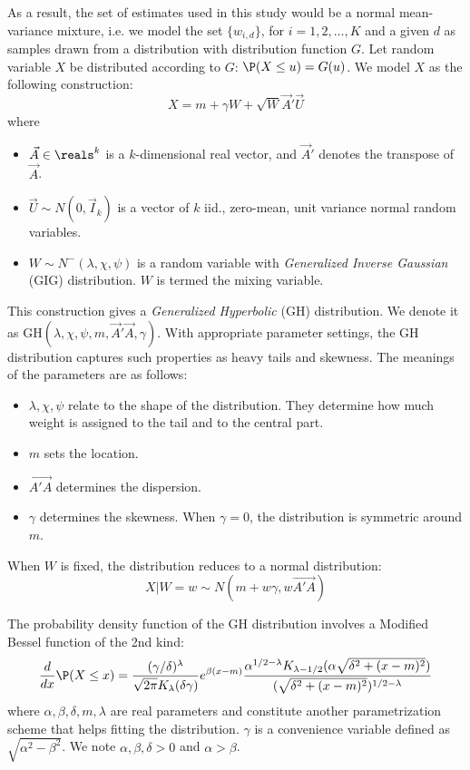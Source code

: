 \documentclass[a4paper,11pt,pdftex,twoside,titlepage]{article}
\begin{document}
As a result, the set of estimates used in this study would be a
normal mean-variance mixture, i.e. we model the set
$\{w_{i,d}\}$, for $i=1,2,\dots, K$ and a given $d$ as samples drawn from
a distribution with distribution function $G$. Let random variable $X$
be distributed according to $G$: $\P(X \leq u) = G(u)$. We model $X$
as the following construction:
\begin{equation}
  \label{eq:rghh6}
  X = m + \gamma W + \sqrt{W} \vec A' \vec U  
\end{equation}
where
\begin{itemize}
\item $\vec A \in \reals^{k}$ is a $k$-dimensional real vector, and
  $\vec A'$ denotes the transpose of $\vec A$.
\item $\vec U \sim N(0, \vec I_k)$ is a vector of $k$ iid., zero-mean,
  unit variance normal random variables.
\item $W \sim N^{-}(\lambda, \chi, \psi)$ is a random variable with
  {\it Generalized Inverse Gaussian} (GIG) distribution. $W$ is
  termed the mixing variable.
\end{itemize}
This construction gives a {\it Generalized Hyperbolic} (GH)
distribution. We denote it as
GH$(\lambda, \chi, \psi, m, \vec A' \vec A, \gamma)$. 
With appropriate parameter settings, the GH distribution captures such
properties as heavy tails and skewness. The meanings of the parameters
are as follows:
\begin{itemize}
\item $\lambda, \chi, \psi$ relate to the shape of the
  distribution. They determine how much weight is assigned to the tail
  and to the central part.
\item $m$ sets the location.
\item $\vec{A'A}$ determines the dispersion.
\item $\gamma$ determines the skewness. When $\gamma = 0$, the
  distribution is symmetric around $m$.
\end{itemize}
When $W$ is fixed, the distribution reduces to a normal distribution:
\[
  X|W = w \sim N(m + w \gamma, w \vec{A' A})
\]

The probability density function of the GH distribution involves a
Modified Bessel function of the 2nd kind:
\begin{equation}
  \label{eq:trhytj54}
  {d \over dx} \P(X \leq x) =
  {
    (\gamma / \delta)^\lambda
    \over
    \sqrt{2\pi} K_{\lambda}(\delta \gamma)
  } e^{\beta (x - m)}
  {
    \alpha^{1/2 - \lambda}
    K_{\lambda - 1/2}(\alpha \sqrt{\delta^2 + (x - m)^2})
    \over
    (\sqrt{\delta^2 + (x - m)^2})^{1/2 - \lambda}
  }
\end{equation}
where $\alpha, \beta, \delta, m, \lambda$ are real parameters and
constitute another parametrization scheme that helps fitting the
distribution. $\gamma$ is a convenience variable defined as
$\sqrt{\alpha^2 - \beta^2}$. We note $\alpha, \beta, \delta > 0$ and
$\alpha > \beta$.
\end{document}
